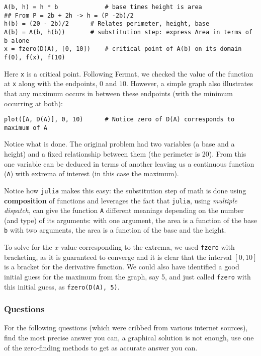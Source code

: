 \documentclass[12pt]{article}
\begin{document}
\begin{verbatim}
A(b, h) = h * b             # base times height is area
## From P = 2b + 2h -> h = (P -2b)/2
h(b) = (20 - 2b)/2      # Relates perimeter, height, base
A(b) = A(b, h(b))       # substitution step: express Area in terms of b alone
x = fzero(D(A), [0, 10])    # critical point of A(b) on its domain
f(0), f(x), f(10)
\end{verbatim}
Here \texttt{x} is a critical point. Following Fermat, we checked the
value of the function at \texttt{x} along with the endpoints, $0$ and
$10$. However, a simple graph also illustrates that any maximum occurs
in between these endpoints (with the minimum occurring at both):



\begin{verbatim}
plot([A, D(A)], 0, 10)      # Notice zero of D(A) corresponds to maximum of A
\end{verbatim}
Notice what is done. The original problem had two variables (a base and
a height) and a fixed relationship between them (the perimeter is 20).
From this one variable can be deduced in terms of another leaving us a
continuous function (\texttt{A}) with extrema of interest (in this case
the maximum).

Notice how \texttt{julia} makes this easy: the substitution step of math
is done using \textbf{composition} of functions and leverages the fact
that \texttt{julia}, using \emph{multiple dispatch}, can give the
function \texttt{A} different meanings depending on the number (and
type) of its arguments: with one argument, the area is a function of the
base \texttt{b} with two arguments, the area is a function of the base
and the height.

To solve for the $x$-value corresponding to the extrema, we used
\texttt{fzero} with bracketing, as it is guaranteed to converge and it
is clear that the interval $[0,10]$ is a bracket for the derivative
function. We could also have identified a good initial guess for the
maximum from the graph, say 5, and just called \texttt{fzero} with this
initial guess, as \texttt{fzero(D(A), 5)}.

\subsubsection{Questions}

For the following questions (which were cribbed from various internet
sources), find the most precise answer you can, a graphical solution is
not enough, use one of the zero-finding methods to get as accurate
answer you can.
\end{document}
